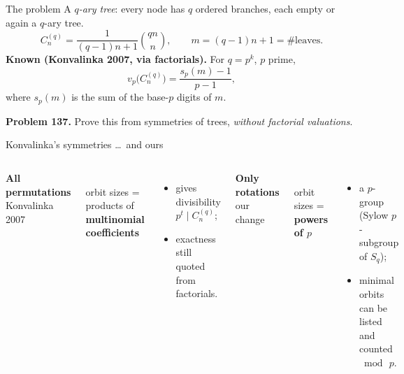 \documentclass[aspectratio=169,11pt]{beamer}
\newcommand{\claimstatus}{}
\newcommand{\status}{\par\vfill{\tiny\color{gray}\claimstatus\par}}
\newcommand{\vp}{v_p}
\newcommand{\sd}{s_p}
\newcommand{\Z}{\mathbb{Z}}
\newcommand{\Cq}{C_n^{(q)}}
\begin{document}
\begin{frame}{The problem}
  A \emph{$q$-ary tree}: every node has $q$ ordered branches,
  each empty or again a $q$-ary tree.
  \[
    \Cq=\frac{1}{(q-1)n+1}\binom{qn}{n},\qquad
    m=(q-1)n+1=\#\text{leaves}.
  \]
  \textbf{Known (Konvalinka 2007, via factorials).}
  For $q=p^k$, $p$ prime,
  \[
    \vp\!\bigl(\Cq\bigr)=\frac{\sd(m)-1}{p-1},
  \]
  where $\sd(m)$ is the sum of the base-$p$ digits of $m$.
  \bigskip

  \textbf{Problem 137.} Prove this \alert{from symmetries of trees},
  \emph{without factorial valuations}.
\end{frame}

\begin{frame}{Konvalinka's symmetries \dots\ and ours}
  \begin{columns}[T]
      \centering\textbf{All permutations}\\[2pt]
      {\small Konvalinka 2007}\\[6pt]
      \\[4pt]
      orbit sizes = products of\\ \textbf{multinomial coefficients}
      \begin{itemize}\small
        \item gives divisibility $p^t\mid\Cq$;
        \item exactness still quoted from factorials.
      \end{itemize}
      \centering\textbf{Only rotations}\\[2pt]
      {\small our change}\\[6pt]
      \\[4pt]
      orbit sizes = \textbf{powers of $p$}
      \begin{itemize}\small
        \item a $p$-group (Sylow $p$-subgroup of $S_q$);
        \item minimal orbits can be listed and counted $\bmod\,p$.
      \end{itemize}
  \end{columns}
  \status
\end{frame}
\end{document}

